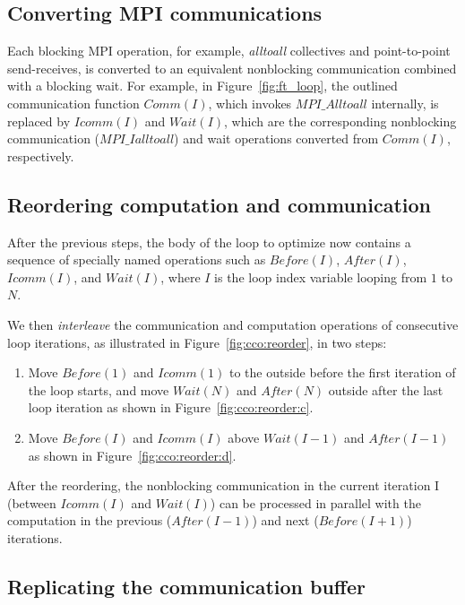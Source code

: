\subsection{Converting MPI communications}

Each blocking MPI operation, for example, {\em alltoall} collectives
and point-to-point send-receives, is converted to an equivalent
nonblocking communication combined with a blocking wait.  For example,
in Figure~\ref{fig:ft_loop}, the outlined communication function
$Comm(I)$, which invokes $MPI\_Alltoall$ internally, is replaced by
$Icomm(I)$ and $Wait(I)$, which are the corresponding nonblocking
communication ($MPI\_Ialltoall$) and wait operations converted from
$Comm(I)$, respectively.


\subsection{Reordering computation and communication}

After the previous steps, the body of the loop to optimize now
contains a sequence of specially named operations such as $Before(I)$,
$After(I)$, $Icomm(I)$, and $Wait(I)$, where $I$ is the loop index
variable looping from $1$ to $N$.

We then \emph{interleave} the communication and computation operations
of consecutive loop iterations, as illustrated in
Figure~\ref{fig:cco:reorder}, in two steps:

\begin{enumerate}

\item Move $Before(1)$ and $Icomm(1)$ to the outside before the first
  iteration of the loop starts, and move $Wait(N)$ and $After(N)$
  outside after the last loop iteration as shown in
  Figure~\ref{fig:cco:reorder:c}.

\item Move $Before(I)$ and $Icomm(I)$ above $Wait(I-1)$ and
  $After(I-1)$ as shown in Figure~\ref{fig:cco:reorder:d}.

\end{enumerate}

After the reordering, the nonblocking communication in the current
iteration I (between $Icomm(I)$ and $Wait(I)$) can be processed in
parallel with the computation in the previous ($After(I-1)$) and next
($Before(I+1)$) iterations.


\subsection{Replicating the communication buffer}

